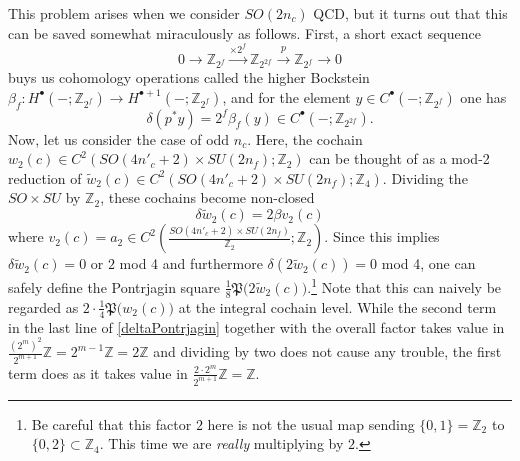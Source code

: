 \documentclass[12pt]{article}
\numberwithin{equation}{section}
\def\bZ{\mathbb{Z}}
\def\fP{\mathfrak{P}}
\begin{document}
This problem arises when we consider $SO(2n_c)$ QCD,
but it turns out that this can be saved somewhat miraculously as follows.
First, a short exact sequence
\begin{equation*}
	0
	\to
	\bZ_{2^f}
	\overset{\times 2^{f}}{\longrightarrow}
	\bZ_{2^{2f}}
	\overset{p}{\longrightarrow}
	\bZ_{2^f}
	\to
	0
\end{equation*}
buys us cohomology operations called the higher Bockstein $\beta_f: H^{\bullet}(-;\bZ_{2^f}) \to H^{\bullet+1}(-;\bZ_{2^f})$,
and for the element $y \in C^{\bullet}(-;\bZ_{2^f})$ one has
\begin{equation*}
	\delta (p^\ast y)
	=
	2^f \beta_f (y) \in C^\bullet(-;\bZ_{2^{2f}}).
\end{equation*}
Now, let us consider the case of odd $n_c$.
Here, the cochain $w_2(c) \in C^2(SO(4n'_c+2)\times SU(2n_f); \bZ_2)$
can be thought of as a mod-2 reduction of $\widetilde w_2(c)\in C^2(SO(4n'_c+2)\times SU(2n_f); \bZ_4)$.
Dividing the $SO\times SU$ by $\bZ_2$, these cochains become non-closed
\begin{equation*}
	\delta \widetilde w_2(c) = 2 \beta v_2(c)
\end{equation*}
where $v_2(c)=a_2\in C^2\left(\tfrac{SO(4n'_c+2)\times SU(2n_f)}{\bZ_2}; \bZ_2\right)$.
Since this implies $\delta \widetilde w_2(c) = 0$ or $2$ mod 4
and furthermore $\delta (2\widetilde w_2(c)) = 0$ mod 4,
one can safely define the Pontrjagin square $\tfrac{1}{8}\fP\big(2\widetilde w_2(c)\big)$.\footnote{
	Be careful that this factor $2$ here is not the usual map sending $\{0,1\}=\bZ_2$ to $\{0,2\}\subset \bZ_4$.
	This time we are \textit{really} multiplying by $2$.
}
Note that this can naively be regarded as $2\cdot \tfrac{1}{4}\fP\big(w_2(c)\big)$ at the integral cochain level.
While the second term in the last line of \eqref{deltaPontrjagin} together with the overall factor takes value in
$\tfrac{(2^m)^2}{2^{m+1}}\bZ = 2^{m-1}\bZ = 2\bZ$ and dividing by two does not cause any trouble,
the first term does as it takes value in $\tfrac{2\cdot 2^m}{2^{m+1}}\bZ = \bZ$.
\end{document}
